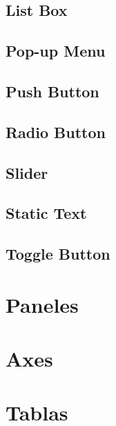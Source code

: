 \subsection{List Box}\label{list-box}

\subsection{Pop-up Menu}\label{pop-up-menu}

\subsection{Push Button}\label{push-button}

\subsection{Radio Button}\label{radio-button}

\subsection{Slider}\label{slider}

\subsection{Static Text}\label{static-text}

\subsection{Toggle Button}\label{toggle-button}


\section{Paneles}\label{paneles}

\section{Axes}\label{axes}

\section{Tablas}\label{tablas}
